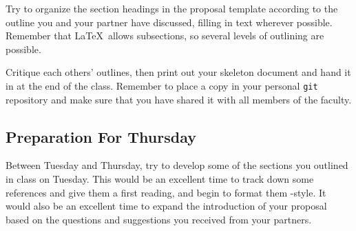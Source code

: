  Try to organize the section headings in the proposal template
according to the outline you and your partner have discussed, filling in text
wherever possible. Remember that \LaTeX\ allows subsections, so several
levels of outlining are possible.

 Critique each others' outlines, then print out your
skeleton document and hand it in at the end of the class. Remember to place a
copy in your personal {\tt git} repository and make sure that you have shared it
with all members of the faculty.

\subsection*{Preparation For Thursday}
Between Tuesday and Thursday, try to develop some of the sections you
outlined in class on Tuesday. This would be an excellent time to track down
some references and give them a first reading, 
and begin to format them \BibTeX-style. It would also be an excellent time to
expand the introduction of your proposal based on the questions and
suggestions you received from your partners.


